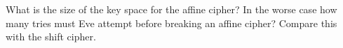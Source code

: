   What is the size of the key space for the affine cipher?
  In the worse case how many tries must Eve attempt before
  breaking an affine cipher?
  Compare this with the shift cipher.

